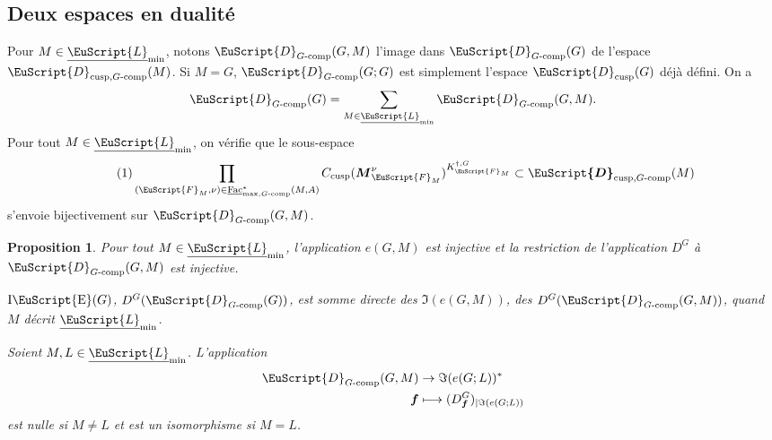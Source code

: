 \documentclass[JEP,XML,SOM,Unicode,francais]{cedram}
\let\mathcal \EuScript
\let\oldenumerate\enumerate
\renewcommand{\enumerate}{\oldenumerate\itemindent0pt}
\newenvironment{enumeratei}
{\bgroup\def\theenumi{\roman{enumi}}\def\theenumii{\arabic{enumii}}\oldenumerate}
{\endenumerate\egroup}
\newcommand\mto{\mathchoice{\longmapsto}{\mapsto}{\mapsto}{\mapsto}}
\newcommand{\tcomp}{\textup{-comp}}
\newcommand{\cusp}{\mathrm{cusp}}
\newcommand{\Fac}{\mathrm{Fac}}
\DeclareMathOperator{\rIE}{I\cE}
\newcommand{\bmf}{\boldsymbol{f}}
\newcommand{\bM}{\boldsymbol{M}}
\newcommand{\cD}{\mathcal{D}}
\newcommand{\cE}{\mathcal{E}}
\newcommand{\cF}{\mathcal{F}}
\newcommand{\cL}{\mathcal{L}}
\theoremstyle{plain}
\newtheorem*{prop*}{Proposition}
\theoremstyle{definition}
\begin{document}
\subsection{Deux espaces en dualité}\label{deuxespaces}

Pour $M\in \underline{\cL}_{\min}$, notons $\cD_{G\tcomp}(G,M)$ l'image dans $\cD_{G\tcomp}(G)$ de
l'espace $\cD_{\cusp,G\tcomp}(M)$. Si $M=G$, $\cD_{G\tcomp}(G;G)$ est simplement l'espace $\cD_{\cusp}(G)$ déjà défini. On a
\[
\cD_{G\tcomp}(G)=\sum_{M\in \underline{\cL}_{\min}}\cD_{G\tcomp}(G,M).
\]
Pour tout $M\in \underline{\cL}_{\min}$,
on vérifie que le sous-espace
\begin{equation}\tag{1}\label{deuxespaces1}
\prod_{(\cF_{M},\nu)\in \underline{\Fac}^*_{\max,G\tcomp}(M,A)}C_{\cusp}(\bM^{\nu}_{\cF_{M}})^{K_{\cF_{M}}^{\dag,G}}\subset \boldsymbol{\cD}_{\cusp,G\tcomp}(M)
\end{equation}
s'envoie bijectivement sur $\cD_{G\tcomp}(G,M)$.

\skpt
\begin{prop*}
\begin{enumeratei}
\item\label{deuxespacesi}
Pour tout $M\in \underline{\cL}_{\min}$, l'application $e(G,M)$ est injective et la restriction de l'application $D^G$ à $\cD_{G\tcomp}(G,M)$ est injective.

\item\label{deuxespacesii}
$\rIE(G)$, \resp $D^G(\cD_{G\tcomp}(G))$, est somme directe des $\Im(e(G,M))$, \resp des $D^G(\cD_{G\tcomp}(G,M))$, quand $M$ décrit $\underline{\cL}_{\min}$.

\item\label{deuxespacesiii}
Soient $M,L\in \underline{\cL}_{\min}$. L'application
\begin{align*}
\cD_{G\tcomp}(G,M)&\to \Im(e(G;L))^*\\
\bmf&\mto (D^G_{\bmf})_{\vert \Im(e(G;L))}
\end{align*}
est nulle si $M\neq L$ et est un isomorphisme si $M=L$.
\end{enumeratei}
\end{prop*}
\end{document}
